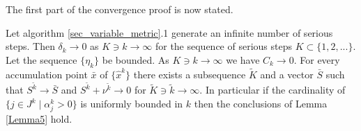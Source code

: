 	

%

The first part of the convergence proof is now stated.

\begin{theorem}
\label{theo_inf_ser_steps}
	Let algorithm \ref{sec_variable_metric}.1 generate an infinite number of serious steps. Then \(\delta_k \to 0\) as \(K \ni k \to \infty\) for the sequence of serious steps \(K \subset \{1,2,...\}\). 
	Let the sequence \(\{\eta_k\}\) be bounded. As \(K \ni k \to \infty\) we have \(C_k \to 0\). For every accumulation point \(\bar{x}\) of \(\{\hat{x}^k\}\) there exists a subsequence \(\tilde{K}\) and  a vector \(\bar{S}\) such that \(S^{\tilde{k}} \to \bar{S}\) and \(S^{\tilde{k}} + \nu^{\tilde{k}} \to 0\) for \(\tilde{K} \ni \tilde{k} \to \infty\).
In particular if the cardinality of \(\{j \in J^k\mid \alpha_j^k > 0\}\) is uniformly bounded in \(k\) then the conclusions of Lemma \ref{Lemma5} hold.
\end{theorem}

